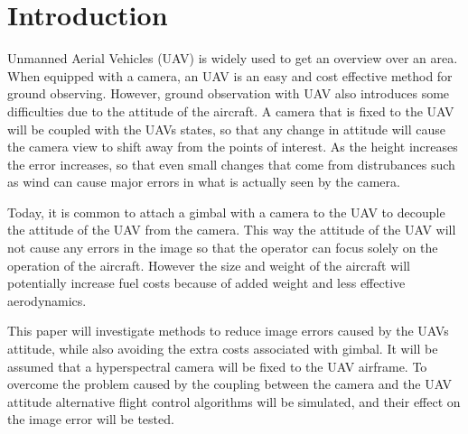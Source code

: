 \section{Introduction}

Unmanned Aerial Vehicles (UAV) is widely used to get an overview over an area. When equipped with a camera, an UAV is an easy and cost effective method for ground observing. However, ground observation with UAV also introduces some difficulties due to the attitude of the aircraft. A camera that is fixed to the UAV will be coupled with the UAVs states, so that any change in attitude will cause the camera view to shift away from the points of interest. As the height increases the error increases, so that even small changes that come from distrubances such as wind can cause major errors in what is actually seen by the camera.

Today, it is common to attach a gimbal with a camera to the UAV to decouple the attitude of the UAV from the camera. This way the attitude of the UAV will not cause any errors in the image so that the operator can focus solely on the operation of the aircraft. However the size and weight of the aircraft will potentially increase fuel costs because of added weight and less effective aerodynamics.

This paper will investigate methods to reduce image errors caused by the UAVs attitude, while also avoiding the extra costs associated with gimbal. It will be assumed that a hyperspectral camera will be fixed to the UAV airframe. To overcome the problem caused by the coupling between the camera and the UAV attitude alternative flight control algorithms will be simulated, and their effect on the image error will be tested.